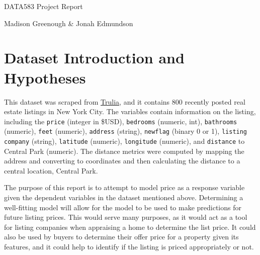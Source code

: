 \documentclass[11pt, a4paper]{article}
\begin{document}


\begin{center}
\LARGE{DATA583 Project Report}
\par
\vspace{1.0pc}
\par
\large{Madison Greenough \& Jonah Edmundson}
\end{center}


\vspace{0.917 pc} %



\section{Dataset Introduction and Hypotheses}

This dataset was scraped from \href{https://www.trulia.com/NY/New\_York/20\_p/}{Trulia}, and it contains 800 recently posted real estate listings in New York City. The variables contain information on the listing, including the \texttt{price} (integer in \$USD), \texttt{bedrooms} (numeric, int), \texttt{bathrooms} (numeric), \texttt{feet} (numeric), \texttt{address} (string), \texttt{newflag} (binary 0 or 1), \texttt{listing company} (string), \texttt{latitude} (numeric), \texttt{longitude} (numeric), and \texttt{distance} to Central Park (numeric). The distance metrics were computed by mapping the address and converting to coordinates and then calculating the distance to a central location, Central Park.

The purpose of this report is to attempt to model price as a response variable given the dependent variables in the dataset mentioned above. Determining a well-fitting model will allow for the model to be used to make predictions for future listing prices. This would serve many purposes, as it would act as a tool for listing companies when appraising a home to determine the list price. It could also be used by buyers to determine their offer price for a property given its features, and it could help to identify if the listing is priced appropriately or not.
\end{document}
